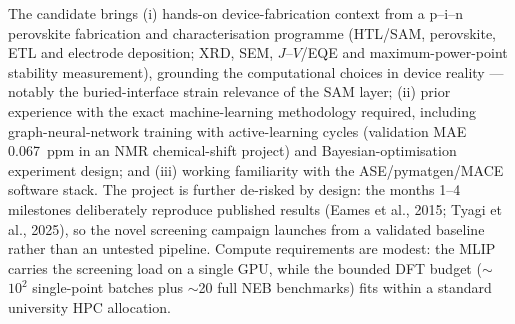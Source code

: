 \documentclass[11pt,a4paper]{article}
\begin{document}
The candidate brings (i) hands-on device-fabrication context from a p--i--n perovskite
fabrication and characterisation programme (HTL/SAM, perovskite, ETL and electrode
deposition; XRD, SEM, $J$--$V$/EQE and maximum-power-point stability measurement),
grounding the computational choices in device reality --- notably the buried-interface
strain relevance of the SAM layer; (ii) prior experience with the exact
machine-learning methodology required, including graph-neural-network training with
active-learning cycles (validation MAE 0.067~ppm in an NMR chemical-shift project) and
Bayesian-optimisation experiment design; and (iii) working familiarity with the
ASE/pymatgen/MACE software stack. The project is further de-risked by design: the
months 1--4 milestones deliberately reproduce published results (Eames et al., 2015;
Tyagi et al., 2025), so the novel screening campaign launches from a validated
baseline rather than an untested pipeline. Compute requirements are modest: the MLIP
carries the screening load on a single GPU, while the bounded DFT budget ($\sim$$10^2$
single-point batches plus $\sim$20 full NEB benchmarks) fits within a standard
university HPC allocation.

\end{document}
